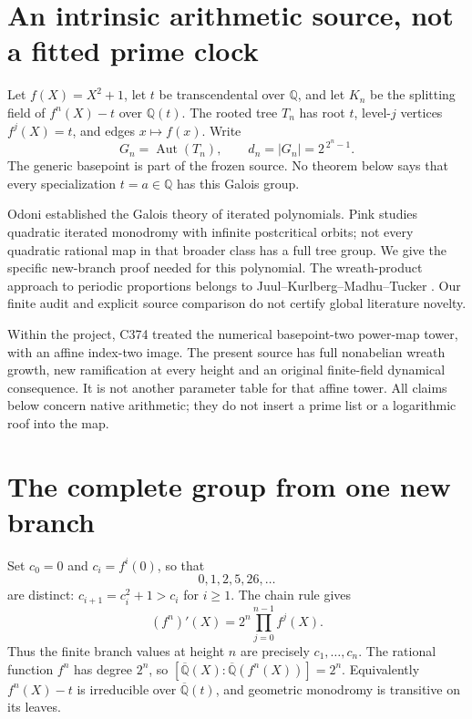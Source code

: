 \documentclass[10pt]{article}
\newcommand{\Aut}{\operatorname{Aut}}
\begin{document}
\section{An intrinsic arithmetic source, not a fitted prime clock}
Let $f(X)=X^2+1$, let $t$ be transcendental over $\mathbb Q$, and let
$K_n$ be the splitting field of $f^n(X)-t$ over $\mathbb Q(t)$.
The rooted tree $T_n$ has root $t$, level-$j$ vertices $f^j(X)=t$,
and edges $x\mapsto f(x)$. Write
\[
 G_n=\Aut(T_n),\qquad d_n=|G_n|=2^{\,2^n-1}.
\]
The generic basepoint is part of the frozen source.
No theorem below says that every specialization $t=a\in\mathbb Q$
has this Galois group.

Odoni \cite{odoni} established the Galois theory of iterated polynomials.
Pink \cite{pink} studies quadratic iterated monodromy with infinite
postcritical orbits; not every quadratic rational map in that broader
class has a full tree group. We give the specific new-branch proof needed
for this polynomial. The wreath-product approach to periodic proportions
belongs to Juul--Kurlberg--Madhu--Tucker \cite{jkmt}.
Our finite audit and explicit source comparison do not certify global
literature novelty.

Within the project, C374 treated the numerical basepoint-two power-map
tower, with an affine index-two image. The present source has full
nonabelian wreath growth, new ramification at every height and an original
finite-field dynamical consequence. It is not another parameter table for
that affine tower. All claims below concern native arithmetic; they do
not insert a prime list or a logarithmic roof into the map.

\section{The complete group from one new branch}
Set $c_0=0$ and $c_i=f^i(0)$, so that
\[
 0,1,2,5,26,\ldots
\]
are distinct: $c_{i+1}=c_i^2+1>c_i$ for $i\ge1$.
The chain rule gives
\begin{equation}\label{der}
 (f^n)'(X)=2^n\prod_{j=0}^{n-1}f^j(X).
\end{equation}
Thus the finite branch values at height $n$ are precisely
$c_1,\ldots,c_n$.
The rational function $f^n$ has degree $2^n$, so
$[\overline{\mathbb Q}(X):\overline{\mathbb Q}(f^n(X))]=2^n$.
Equivalently $f^n(X)-t$ is irreducible over $\overline{\mathbb Q}(t)$,
and geometric monodromy is transitive on its leaves.
\end{document}
